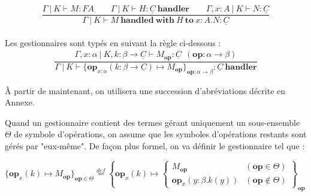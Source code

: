 	\[\dfrac{\Gamma~|~K \vdash M:FA\quad\quad\Gamma~|~K \vdash H : \underline{C}~\textbf{handler}\quad\quad\Gamma,x:A~|~K \vdash N:\underline{C}}{\Gamma~|~K \vdash M~\textbf{handled}~\textbf{with}~H~\textbf{to}~x:A.N : \underline{C}}\]	
	\\
	Les gestionnaires sont typés en suivant la règle ci-dessous : 
	\begin{align*}
		\dfrac{\Gamma,x:\alpha~|~K,k:\beta \rightarrow \underline{C} \vdash M_\textbf{op}:\underline{C}~~(\textbf{op}: \alpha \rightarrow \beta)}{\Gamma~|~K \vdash \{\textbf{op}_{x : \alpha}(k:\beta \rightarrow \underline{C}) \mapsto M_\textbf{op}\}_{\textbf{op}:\alpha \rightarrow \beta}:\underline{C}~\textbf{handler}}
	\end{align*}

	À partir de maintenant, on utilisera une succession d'abréviations décrite en Annexe.
	\medbreak
	
	\begin{definition}\label{fctnOp}
		Quand un gestionnaire contient des termes gérant uniquement un sous-ensemble $\Theta$ de symbole d'opérations, on assume que les symboles d'opérations restants sont gérés par "eux-même". De façon plus formel, on va définir le gestionnaire tel que :
		
		
		\begin{center}
			$ \{\textbf{op}_x(k) \mapsto M_\textbf{op}\}_{\textbf{op} \in \Theta} \overset{def}{=}
			\left \{ \textbf{op}_x(k) \mapsto
			\left \{ 
			\begin{array}{lr}
			M_\textbf{op}&(\textbf{op} \in \Theta) \\
			\textbf{op}_x(y:\beta.k(y))&(\textbf{op} \notin \Theta)
			\end{array}
			\right \}
			\right .
			_\textbf{op}$ 
		\end{center}
	\end{definition}



